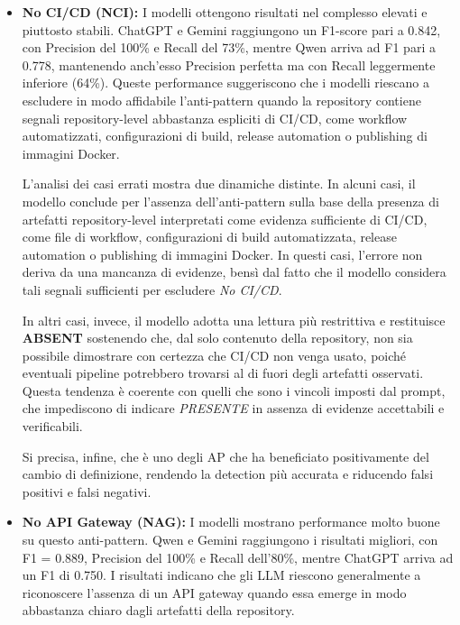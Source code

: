 \begin{itemize}
    A differenza del \textit{Wrong Cuts} (WC) la cui rilevazione si basa prevalentemente su segnali semantici e sintattici osservabili nella struttura del repository, i casi di \textit{Mega-Service} e \textit{Nano-Service} presentano una natura ibrida e multidimensionale.

    \item \textbf{No CI/CD (NCI):} I modelli ottengono risultati nel complesso elevati e piuttosto stabili. ChatGPT e Gemini raggiungono un F1-score pari a 0.842, con Precision del 100\% e Recall del 73\%, mentre Qwen arriva ad F1 pari a 0.778, mantenendo anch'esso Precision perfetta ma con Recall leggermente inferiore (64\%). Queste performance suggeriscono che i modelli riescano a escludere in modo affidabile l’anti-pattern quando la repository contiene segnali repository-level abbastanza espliciti di CI/CD, come workflow automatizzati, configurazioni di build, release automation o publishing di immagini Docker.

    L’analisi dei casi errati mostra due dinamiche distinte. In alcuni casi, il modello conclude per l’assenza dell’anti-pattern sulla base della presenza di artefatti repository-level interpretati come evidenza sufficiente di CI/CD, come file di workflow, configurazioni di build automatizzata, release automation o publishing di immagini Docker. In questi casi, l’errore non deriva da una mancanza di evidenze, bensì dal fatto che il modello considera tali segnali sufficienti per escludere \textit{No CI/CD}.
    
    In altri casi, invece, il modello adotta una lettura più restrittiva e restituisce \textbf{ABSENT} sostenendo che, dal solo contenuto della repository, non sia possibile dimostrare con certezza che CI/CD non venga usato, poiché eventuali pipeline potrebbero trovarsi al di fuori degli artefatti osservati. Questa tendenza è coerente con quelli che sono i vincoli imposti dal prompt, che impediscono di indicare \textit{PRESENTE} in assenza di evidenze accettabili e verificabili. 
    
    Si precisa, infine, che è uno degli AP che ha beneficiato positivamente del cambio di definizione, rendendo la detection più accurata e riducendo falsi positivi e falsi negativi.

    \item \textbf{No API Gateway (NAG):} I modelli mostrano performance molto buone su questo anti-pattern. Qwen e Gemini raggiungono i risultati migliori, con F1 = 0.889, Precision del 100\% e Recall dell'80\%, mentre ChatGPT arriva ad un F1 di 0.750. I risultati indicano che gli LLM riescono generalmente a riconoscere l'assenza di un API gateway quando essa emerge in modo abbastanza chiaro dagli artefatti della repository.


\end{itemize}

